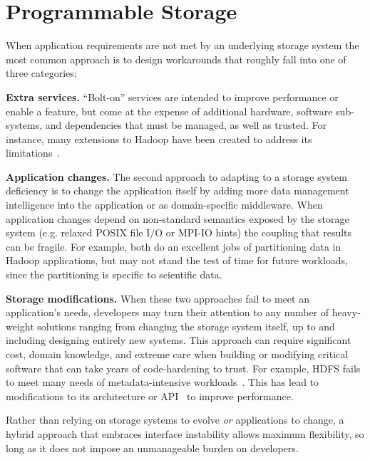 \section{Programmable Storage}
\label{sec:progly}

When application requirements are not met by an underlying storage system the
most common approach is to design workarounds that roughly fall into one
of three categories:

{\bf Extra services.} ``Bolt-on'' services are intended to improve performance
or enable a feature, but come at the expense of additional hardware, software
sub-systems, and dependencies that must be managed, as well as trusted.
For instance, many extensions to Hadoop have been created to address its
limitations~\cite{bu:vldb2010-haloop, ekanayake:hpdc2010-twister,
ekanayake:escience2008-eglmapreduce, mihailescu:hotstorage2012-mixapart}.

{\bf Application changes.} The second approach to adapting to a storage system
deficiency is to change the application itself by adding more data management
intelligence into the application or as domain-specific middleware. When
application changes depend on non-standard semantics exposed by the storage
system (e.g. relaxed POSIX file I/O or MPI-IO hints) the coupling that results
can be fragile.
For example, \cite{buck:hpc2011-scihadoop, gkantsidis:nsdi2013-rhea} both do
an excellent jobs of partitioning data in Hadoop applications, but may not
stand the test of time for future workloads, since the partitioning is
specific to scientific data.

{\bf Storage modifications.} When these two approaches fail to meet an
application's needs, developers may turn their attention to any number of
heavy-weight solutions ranging from changing the storage system itself, up to
and including designing entirely new systems. This approach can require
significant cost, domain knowledge, and extreme care when building or
modifying critical software that can take years of code-hardening to trust.
For example, HDFS fails to meet many needs 
of metadata-intensive workloads~\cite{shvachko:login2012-hdfs-scalability}.
This has lead to modifications to its architecture or
API~\cite{balmin:sigmod2012-clydesdale} to improve performance.

Rather than relying on storage systems to evolve \emph{or} applications to
change, a hybrid approach that embraces interface instability allows maximum
flexibility, so long as it does not impose an unmanageable burden on
developers.

